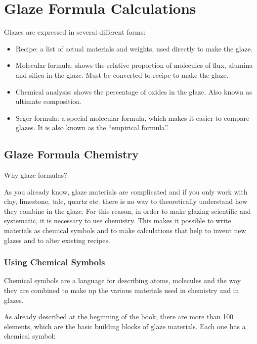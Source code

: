 \chapter{Glaze Formula Calculations}
Glazes are expressed in several different forms:
\begin{itemize}
\item Recipe: a list of actual materials and weights, used directly to make the 
glaze.

\item Molecular formula: shows the relative proportion of molecules of flux, 
alumina and silica in the glaze. Must be converted to recipe to make the glaze.

\item Chemical analysis: shows the percentage of oxides in the glaze. Also 
known as ultimate composition.

\item Seger formula: a special molecular formula, which makes it easier to 
compare glazes. It is also known as the ``empirical formula''.
\end{itemize}
\section{Glaze Formula Chemistry}
Why glaze formulas?

As you already know, glaze materials are complicated and if you only work with 
clay, limestone, talc, quartz etc. there is no way to theoretically understand 
how they combine in the glaze. For this reason, in order to make glazing 
scientific and systematic, it is necessary to use chemistry. This makes it 
possible to write materials as chemical symbols and to make calculations that 
help to invent new glazes and to alter existing recipes.
\subsection{Using Chemical Symbols}
Chemical symbols are a language for describing atoms, molecules and the way 
they are combined to make up the various materials used in chemistry and in 
glazes.

As already described at the beginning of the book, there are more than 100 
elements, which are the basic building blocks of glaze materials. Each one has 
a chemical symbol:

